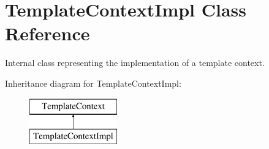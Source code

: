 \hypertarget{class_template_context_impl}{}\section{Template\+Context\+Impl Class Reference}
\label{class_template_context_impl}


Internal class representing the implementation of a template context.  


Inheritance diagram for Template\+Context\+Impl\+:\begin{figure}[H]
\begin{center}
\leavevmode
\includegraphics[height=2.000000cm]{class_template_context_impl}
\end{center}
\end{figure}
